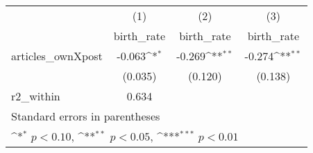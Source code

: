 {
\def\sym#1{\ifmmode^{#1}\else\(^{#1}\)\fi}
\begin{tabular}{l*{3}{c}}
\hline\hline
            &\multicolumn{1}{c}{(1)}&\multicolumn{1}{c}{(2)}&\multicolumn{1}{c}{(3)}\\
            &\multicolumn{1}{c}{birth\_rate}&\multicolumn{1}{c}{birth\_rate}&\multicolumn{1}{c}{birth\_rate}\\
\hline
articles\_ownXpost&      -0.063\sym{*}  &      -0.269\sym{**} &      -0.274\sym{**} \\
            &     (0.035)         &     (0.120)         &     (0.138)         \\
\hline
r2\_within   &       0.634         &                     &                     \\
\hline\hline
\multicolumn{4}{l}{\footnotesize Standard errors in parentheses}\\
\multicolumn{4}{l}{\footnotesize \sym{*} \(p<0.10\), \sym{**} \(p<0.05\), \sym{***} \(p<0.01\)}\\
\end{tabular}
}
